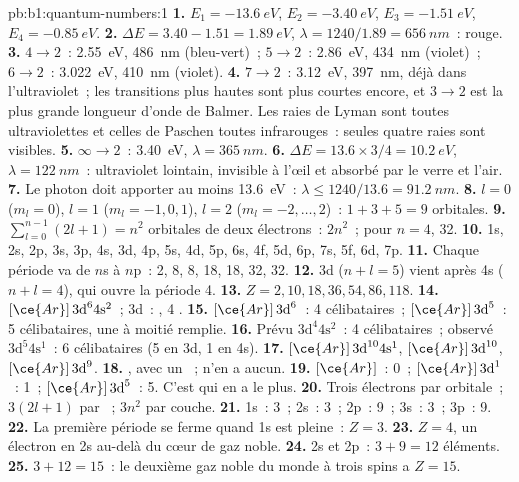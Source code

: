 \begin{solution}{pb:b1:quantum-numbers:1}
\textbf{1.} $E_1 = \qty{-13.6}{eV}$, $E_2 = \qty{-3.40}{eV}$,
$E_3 = \qty{-1.51}{eV}$, $E_4 = \qty{-0.85}{eV}$.
\textbf{2.} $\Delta E = 3.40 - 1.51 = \qty{1.89}{eV}$, $\lambda = 1240/1.89
= \qty{656}{nm}$~: rouge.
\textbf{3.} $4 \to 2$~: \qty{2.55}{eV}, \qty{486}{nm} (bleu-vert)~;
$5 \to 2$~: \qty{2.86}{eV}, \qty{434}{nm} (violet)~; $6 \to 2$~: \qty{3.022}{eV},
\qty{410}{nm} (violet).
\textbf{4.} $7 \to 2$~: \qty{3.12}{eV}, \qty{397}{nm}, déjà dans
l'ultraviolet~; les transitions plus hautes sont plus courtes encore, et
$3 \to 2$ est la plus grande longueur d'onde de Balmer. Les raies de
Lyman sont toutes ultraviolettes et celles de Paschen toutes
infrarouges~: seules quatre raies sont visibles.
\textbf{5.} $\infty \to 2$~: \qty{3.40}{eV}, $\lambda = \qty{365}{nm}$.
\textbf{6.} $\Delta E = 13.6 \times 3/4 = \qty{10.2}{eV}$, $\lambda =
\qty{122}{nm}$~: ultraviolet lointain, invisible à l'œil et absorbé par
le verre et l'air.
\textbf{7.} Le photon doit apporter au moins \qty{13.6}{eV}~: $\lambda \le
1240/13.6 = \qty{91.2}{nm}$.
\textbf{8.} $l = 0$ ($m_l = 0$), $l = 1$ ($m_l = -1, 0, 1$), $l = 2$
($m_l = -2, \dots, 2$)~: $1 + 3 + 5 = 9$ orbitales.
\textbf{9.} $\sum_{l=0}^{n-1}(2l+1) = n^2$ orbitales de deux électrons~:
$2n^2$~; pour $n = 4$, 32.
\textbf{10.} 1s, 2s, 2p, 3s, 3p, 4s, 3d, 4p, 5s, 4d, 5p, 6s, 4f, 5d, 6p,
7s, 5f, 6d, 7p.
\textbf{11.} Chaque période va de $n$s à $n$p~: 2, 8, 8, 18, 18, 32, 32.
\textbf{12.} 3d ($n + l = 5$) vient après 4s ($n + l = 4$), qui ouvre
la période 4.
\textbf{13.} $Z = 2, 10, 18, 36, 54, 86, 118$.
\textbf{14.} $[\ce{Ar}]\,3\text{d}^6 4\text{s}^2$~; 3d~: ,
4 .
\textbf{15.}  $[\ce{Ar}]\,3\text{d}^6$~: 4 célibataires~;
 $[\ce{Ar}]\,3\text{d}^5$~: 5 célibataires, une  à
moitié remplie.
\textbf{16.} Prévu $3\text{d}^4 4\text{s}^2$~: 4 célibataires~; observé
$3\text{d}^5 4\text{s}^1$~: 6 célibataires (5 en 3d, 1 en 4s).
\textbf{17.}  $[\ce{Ar}]\,3\text{d}^{10} 4\text{s}^1$, 
$[\ce{Ar}]\,3\text{d}^{10}$,  $[\ce{Ar}]\,3\text{d}^9$.
\textbf{18.} , avec un ~;  n'en a
aucun.
\textbf{19.}  $[\ce{Ar}]$~: 0~;  $[\ce{Ar}]\,3\text{d}^1$~:
1~;  $[\ce{Ar}]\,3\text{d}^5$~: 5. C'est  qui en a
le plus.
\textbf{20.} Trois électrons par orbitale~; $3(2l + 1)$ par ~;
$3n^2$ par couche.
\textbf{21.} 1s~: 3~; 2s~: 3~; 2p~: 9~; 3s~: 3~; 3p~: 9.
\textbf{22.} La première période se ferme quand 1s est pleine~: $Z = 3$.
\textbf{23.} $Z = 4$, un électron en 2s au-delà du cœur de gaz noble.
\textbf{24.} 2s et 2p~: $3 + 9 = 12$ éléments.
\textbf{25.} $3 + 12 = 15$~: le deuxième gaz noble du monde à trois
spins a \textbf{$Z = 15$}.
\end{solution}
